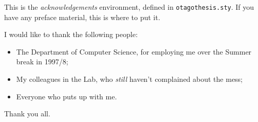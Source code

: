 This is the {\em acknowledgements} environment, defined in
{\tt otagothesis.sty}.  If you have any preface material, this is where to
put it.  

I would like to thank the following people:
  \begin{itemize}
  \item The Department of Computer Science, for employing me over the
  Summer break in 1997/8;
  \item My colleagues in the Lab, who {\em still} haven't
  complained about the mess;
  \item Everyone who puts up with me.
  \end{itemize}
Thank you all.
